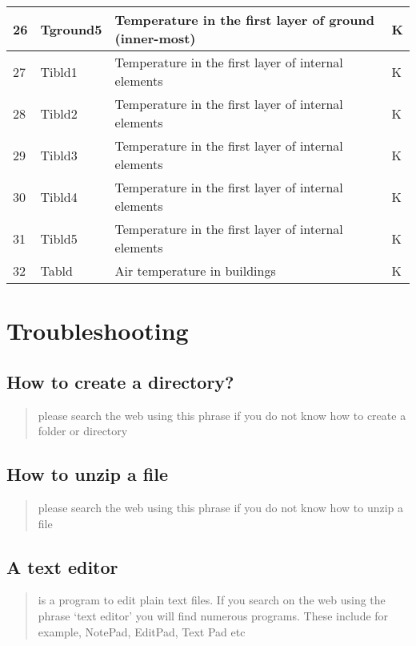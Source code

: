 \documentclass[letterpaper,10pt,english]{sphinxmanual}
\begin{document}
\begin{savenotes}
\begin{longtable}{|l|l|l|l|}
\hline
26
&
Tground5
&
Temperature in the first layer of ground (inner-most)
&
K
\\
\hline
27
&
Tibld1
&
Temperature in the first layer of internal elements
&
K
\\
\hline
28
&
Tibld2
&
Temperature in the first layer of internal elements
&
K
\\
\hline
29
&
Tibld3
&
Temperature in the first layer of internal elements
&
K
\\
\hline
30
&
Tibld4
&
Temperature in the first layer of internal elements
&
K
\\
\hline
31
&
Tibld5
&
Temperature in the first layer of internal elements
&
K
\\
\hline
32
&
Tabld
&
Air temperature in buildings
&
K
\\
\hline
\end{longtable}\sphinxatlongtableend\end{savenotes}


\chapter{Troubleshooting}
\label{\detokenize{troubleshooting::doc}}\label{\detokenize{troubleshooting:troubleshooting}}\label{\detokenize{troubleshooting:id1}}

\section{How to create a directory?}
\label{\detokenize{troubleshooting:how-to-create-a-directory}}\begin{quote}

please search the web using this phrase if you do not know how to
create a folder or directory
\end{quote}


\section{How to unzip a file}
\label{\detokenize{troubleshooting:how-to-unzip-a-file}}\begin{quote}

please search the web using this phrase if you do not know how to
unzip a file
\end{quote}


\section{A text editor}
\label{\detokenize{troubleshooting:a-text-editor}}\begin{quote}

is a program to edit plain text files. If you search on the web
using the phrase ‘text editor’ you will find numerous programs.
These include for example, NotePad, EditPad, Text Pad etc
\end{quote}
\end{document}
